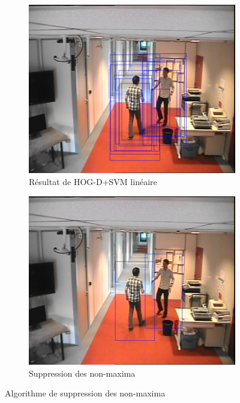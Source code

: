 \documentclass[12pt]{article}
\begin{document}
\begin{figure}[!ht]
	\centering
	\begin{subfigure}{.45\textwidth}
		\centering
		\includegraphics[clip=true,trim=200 0 100 100,width=\linewidth]{img/nonmax1.png}
		\caption{Résultat de HOG-D+SVM linéaire}
	\end{subfigure}
	\begin{subfigure}{.45\textwidth}
		\centering
		\includegraphics[clip=true,trim=200 0 100 100,width=\linewidth]{img/nonmax2.png}
		\caption{Suppression des non-maxima}
	\end{subfigure}
	\caption{Algorithme de suppression des non-maxima}
	\label{fig:nonmaxima}
\end{figure}
\end{document}
